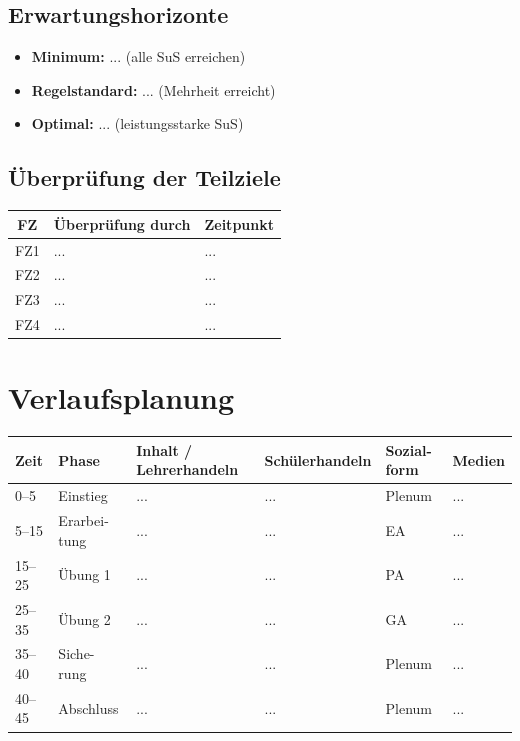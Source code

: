 \documentclass[11pt,a4paper]{article}
\begin{document}
{\subsection{Erwartungshorizonte}
\begin{itemize}
    \item \textbf{Minimum:} ... (alle SuS erreichen)
    \item \textbf{Regelstandard:} ... (Mehrheit erreicht)
    \item \textbf{Optimal:} ... (leistungsstarke SuS)
\end{itemize}

\subsection{Überprüfung der Teilziele}
\begin{tabular}{|c|l|l|}
\hline
\textbf{FZ} & \textbf{Überprüfung durch} & \textbf{Zeitpunkt} \\
\hline
FZ1 & ... & ... \\
FZ2 & ... & ... \\
FZ3 & ... & ... \\
FZ4 & ... & ... \\
\hline
\end{tabular}
}

\section{Verlaufsplanung}

\begin{longtable}{|p{1cm}|p{1.5cm}|p{4cm}|p{3cm}|p{2cm}|p{2cm}|}
\hline
\textbf{Zeit} & \textbf{Phase} & \textbf{Inhalt / Lehrerhandeln} & \textbf{Schülerhandeln} & \textbf{Sozial-form} & \textbf{Medien} \\
\hline
\endhead

0--5 & Einstieg & ... & ... & Plenum & ... \\
\hline

5--15 & Erarbei-tung & ... & ... & EA & ... \\
\hline

15--25 & Übung 1 & ... & ... & PA & ... \\
\hline

25--35 & Übung 2 & ... & ... & GA & ... \\
\hline

35--40 & Siche-rung & ... & ... & Plenum & ... \\
\hline

40--45 & Abschluss & ... & ... & Plenum & ... \\
\hline
\end{longtable}
\end{document}
